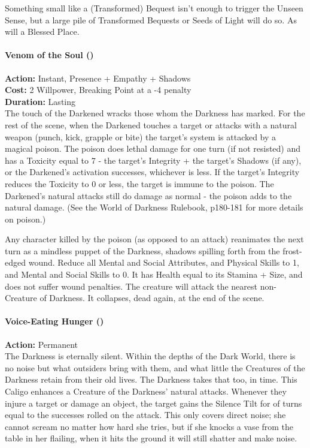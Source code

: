 Something small like a (Transformed) Bequest isn't enough to trigger the Unseen Sense, but a large pile of Transformed Bequests or Seeds of Light will do so. As will a Blessed Place. 

\paragraph*{Venom of the Soul (\textbullet\textbullet\textbullet\textbullet\textbullet)}

\noindent \textbf{Action:} Instant, Presence + Empathy + Shadows\\

\noindent \textbf{Cost:} 2 Willpower, Breaking Point at a -4 penalty\\

\noindent \textbf{Duration:} Lasting \\

\noindent The touch of the Darkened wracks those whom the Darkness has marked. For the rest of the scene, when the Darkened touches a target or attacks with a natural weapon (punch, kick, grapple or bite) the target's system is attacked by a magical poison. The poison does lethal damage for one turn (if not resisted) and has a Toxicity equal to 7 - the target's Integrity + the target's Shadows (if any), or the Darkened's activation successes, whichever is less. If the target's Integrity reduces the Toxicity to 0 or less, the target is immune to the poison. The Darkened's natural attacks still do damage as normal - the poison adds to the natural damage. (See the World of Darkness Rulebook, p180-181 for more details on poison.)

Any character killed by the poison (as opposed to an attack) reanimates the next turn as a mindless puppet of the Darkness, shadows spilling forth from the frost-edged wound. Reduce all Mental and Social Attributes, and Physical Skills to 1, and Mental and Social Skills to 0. It has Health equal to its Stamina + Size, and does not suffer wound penalties. The creature will attack the nearest non-Creature of Darkness. It collapses, dead again, at the end of the scene.

\paragraph*{Voice-Eating Hunger (\textbullet)}

\noindent \textbf{Action:} Permanent\\

\noindent The Darkness is eternally silent. Within the depths of the Dark World, there is no noise but what outsiders bring with them, and what little the Creatures of the Darkness retain from their old lives. The Darkness takes that too, in time. This Caligo enhances a Creature of the Darkness' natural attacks. Whenever they injure a target or damage an object, the target gains the Silence Tilt for of turns equal to the successes rolled on the attack. This only covers direct noise; she cannot scream no matter how hard she tries, but if she knocks a vase from the table in her flailing, when it hits the ground it will still shatter and make noise.


